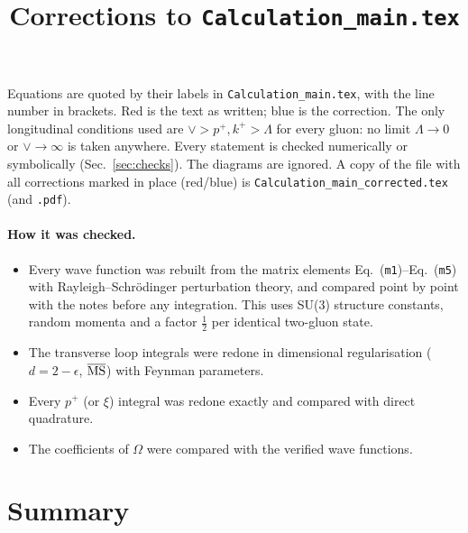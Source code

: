 \documentclass[10pt]{article}
\title{Corrections to \texttt{Calculation\_main.tex}}
\author{}
\date{}
\newcommand{\eqn}[1]{Eq.~(\texttt{#1})}
\begin{document}
\maketitle
\sloppy

\noindent Equations are quoted by their labels in \texttt{Calculation\_main.tex}, with the line number in brackets. Red is the text as written; blue is the correction. The only longitudinal conditions used are $\vee>p^+,k^+>\Lambda$ for every gluon: no limit $\Lambda\to0$ or $\vee\to\infty$ is taken anywhere. Every statement is checked numerically or symbolically (Sec.~\ref{sec:checks}). The diagrams are ignored. A copy of the file with all corrections marked in place (red/blue) is \texttt{Calculation\_main\_corrected.tex} (and \texttt{.pdf}).

\paragraph{How it was checked.}
\begin{itemize}
\item Every wave function was rebuilt from the matrix elements \eqn{m1}--\eqn{m5} with Rayleigh--Schr\"odinger perturbation theory, and compared point by point with the notes before any integration. This uses SU(3) structure constants, random momenta and a factor $\frac12$ per identical two-gluon state.
\item The transverse loop integrals were redone in dimensional regularisation ($d=2-\epsilon$, $\overline{\rm MS}$) with Feynman parameters.
\item Every $p^+$ (or $\xi$) integral was redone exactly and compared with direct quadrature.
\item The coefficients of $\Omega$ were compared with the verified wave functions.
\end{itemize}

\tableofcontents

\section{Summary}
\end{document}

